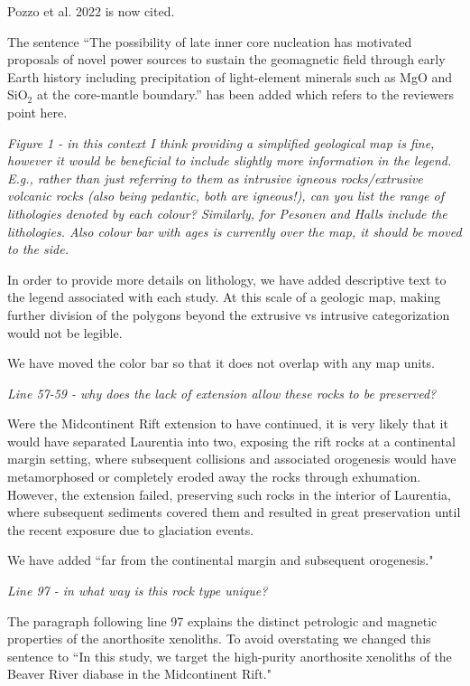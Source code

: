 \documentclass[11pt, letterpaper]{article}
\begin{document}
\begin{flushleft}
Pozzo et al. 2022 is now cited.

The sentence ``The possibility of late inner core nucleation has motivated proposals of novel power sources to sustain the geomagnetic field through early Earth history including precipitation of light-element minerals such as MgO \cite{Badro2016a, ORourke2016a, ORourke2016b} and SiO$_2$ \cite{Mittal2020a} at the core-mantle boundary.'' has been added which refers to the reviewers point here.

\textit{Figure 1 - in this context I think providing a simplified geological map is fine, however it would be beneficial to include slightly more information in the legend. E.g., rather than just referring to them as intrusive igneous rocks/extrusive volcanic rocks (also being pedantic, both are igneous!), can you list the range of lithologies denoted by each colour? Similarly, for Pesonen and Halls include the lithologies. Also colour bar with ages is currently over the map, it should be moved to the side.}

In order to provide more details on lithology, we have added descriptive text to the legend associated with each study. At this scale of a geologic map, making further division of the polygons beyond the extrusive vs intrusive categorization would not be legible.

We have moved the color bar so that it does not overlap with any map units.

\textit{Line 57-59 - why does the lack of extension allow these rocks to be preserved?}

Were the Midcontinent Rift extension to have continued, it is very likely that it would have separated Laurentia into two, exposing the rift rocks at a continental margin setting, where subsequent collisions and associated orogenesis would have metamorphosed or completely eroded away the rocks through exhumation. However, the extension failed, preserving such rocks in the interior of Laurentia, where subsequent sediments covered them and resulted in great preservation until the recent exposure due to glaciation events.

We have added ``far from the continental margin and subsequent orogenesis."

\textit{Line 97 - in what way is this rock type unique?}

The paragraph following line 97 explains the distinct petrologic and magnetic properties of the anorthosite xenoliths. To avoid overstating we changed this sentence to ``In this study, we target the high-purity anorthosite xenoliths of the Beaver River diabase in the Midcontinent Rift." 


\end{flushleft}
\end{document}

